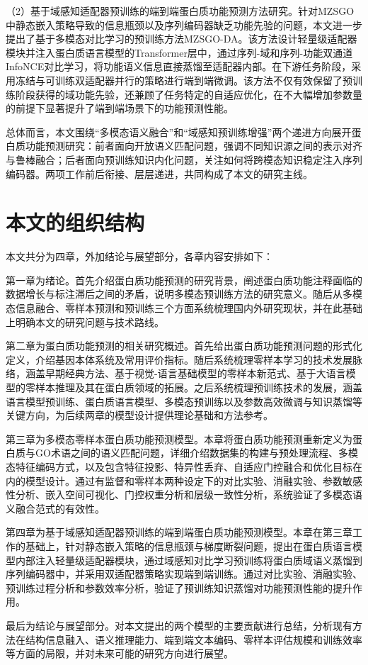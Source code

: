 （2）基于域感知适配器预训练的端到端蛋白质功能预测方法研究。针对MZSGO中静态嵌入策略导致的信息瓶颈以及序列编码器缺乏功能先验的问题，本文进一步提出了基于多模态对比学习的预训练方法MZSGO-DA。该方法设计轻量级适配器模块并注入蛋白质语言模型的Transformer层中，通过序列-域和序列-功能双通道InfoNCE对比学习，将功能语义信息直接蒸馏至适配器内部。在下游任务阶段，采用冻结与可训练双适配器并行的策略进行端到端微调。该方法不仅有效保留了预训练阶段获得的域功能先验，还兼顾了任务特定的自适应优化，在不大幅增加参数量的前提下显著提升了端到端场景下的功能预测性能。

总体而言，本文围绕“多模态语义融合”和“域感知预训练增强”两个递进方向展开蛋白质功能预测研究：前者面向开放语义匹配问题，强调不同知识源之间的表示对齐与鲁棒融合；后者面向预训练知识内化问题，关注如何将跨模态知识稳定注入序列编码器。两项工作前后衔接、层层递进，共同构成了本文的研究主线。

\section{本文的组织结构}

本文共分为四章，外加结论与展望部分，各章内容安排如下：

第一章为绪论。首先介绍蛋白质功能预测的研究背景，阐述蛋白质功能注释面临的数据增长与标注滞后之间的矛盾，说明多模态预训练方法的研究意义。随后从多模态信息融合、零样本预测和预训练三个方面系统梳理国内外研究现状，并在此基础上明确本文的研究问题与技术路线。

第二章为蛋白质功能预测的相关研究概述。首先给出蛋白质功能预测问题的形式化定义，介绍基因本体系统及常用评价指标。随后系统梳理零样本学习的技术发展脉络，涵盖早期经典方法、基于视觉-语言基础模型的零样本新范式、基于大语言模型的零样本推理及其在蛋白质领域的拓展。之后系统梳理预训练技术的发展，涵盖语言模型预训练、蛋白质语言模型、多模态预训练以及参数高效微调与知识蒸馏等关键方向，为后续两章的模型设计提供理论基础和方法参考。

第三章为多模态零样本蛋白质功能预测模型。本章将蛋白质功能预测重新定义为蛋白质与GO术语之间的语义匹配问题，详细介绍数据集的构建与预处理流程、多模态特征编码方式，以及包含特征投影、特异性丢弃、自适应门控融合和优化目标在内的模型设计。通过有监督和零样本两种设定下的对比实验、消融实验、参数敏感性分析、嵌入空间可视化、门控权重分析和层级一致性分析，系统验证了多模态语义融合范式的有效性。

第四章为基于域感知适配器预训练的端到端蛋白质功能预测模型。本章在第三章工作的基础上，针对静态嵌入策略的信息瓶颈与梯度断裂问题，提出在蛋白质语言模型内部注入轻量级适配器模块，通过域感知对比学习预训练将蛋白质域语义蒸馏到序列编码器中，并采用双适配器策略实现端到端训练。通过对比实验、消融实验、预训练过程分析和参数效率分析，验证了预训练知识蒸馏对功能预测性能的提升作用。

最后为结论与展望部分。对本文提出的两个模型的主要贡献进行总结，分析现有方法在结构信息融入、语义推理能力、端到端文本编码、零样本评估规模和训练效率等方面的局限，并对未来可能的研究方向进行展望。